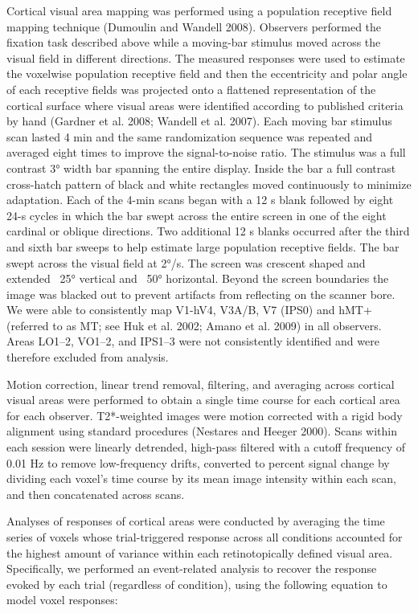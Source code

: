 \documentclass{report}
\begin{document}
Cortical visual area mapping was performed using a population receptive field mapping technique (Dumoulin and Wandell 2008). Observers performed the fixation task described above while a moving-bar stimulus moved across the visual field in different directions. The measured responses were used to estimate the voxelwise population receptive field and then the eccentricity and polar angle of each receptive fields was projected onto a flattened representation of the cortical surface where visual areas were identified according to published criteria by hand (Gardner et al. 2008; Wandell et al. 2007). Each moving bar stimulus scan lasted 4 min and the same randomization sequence was repeated and averaged eight times to improve the signal-to-noise ratio. The stimulus was a full contrast 3° width bar spanning the entire display. Inside the bar a full contrast cross-hatch pattern of black and white rectangles moved continuously to minimize adaptation. Each of the 4-min scans began with a 12 s blank followed by eight 24-s cycles in which the bar swept across the entire screen in one of the eight cardinal or oblique directions. Two additional 12 s blanks occurred after the third and sixth bar sweeps to help estimate large population receptive fields. The bar swept across the visual field at 2°/s. The screen was crescent shaped and extended ~25° vertical and ~50° horizontal. Beyond the screen boundaries the image was blacked out to prevent artifacts from reflecting on the scanner bore. We were able to consistently map V1-hV4, V3A/B, V7 (IPS0) and hMT+ (referred to as MT; see Huk et al. 2002; Amano et al. 2009) in all observers. Areas LO1–2, VO1–2, and IPS1–3 were not consistently identified and were therefore excluded from analysis.

Motion correction, linear trend removal, filtering, and averaging across cortical visual areas were performed to obtain a single time course for each cortical area for each observer. T2*-weighted images were motion corrected with a rigid body alignment using standard procedures (Nestares and Heeger 2000). Scans within each session were linearly detrended, high-pass filtered with a cutoff frequency of 0.01 Hz to remove low-frequency drifts, converted to percent signal change by dividing each voxel’s time course by its mean image intensity within each scan, and then concatenated across scans.

Analyses of responses of cortical areas were conducted by averaging the time series of voxels whose trial-triggered response across all conditions accounted for the highest amount of variance within each retinotopically defined visual area. Specifically, we performed an event-related analysis to recover the response evoked by each trial (regardless of condition), using the following equation to model voxel responses:
\end{document}
